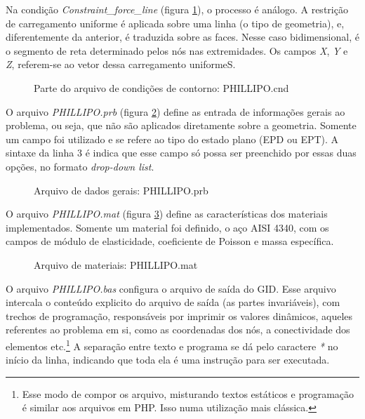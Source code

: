 Na condição \emph{Constraint\_force\_line} (figura \ref{fig:PHILLIPO.cnd_2}), o processo é análogo. A restrição de carregamento uniforme é aplicada sobre uma linha (o tipo de geometria), e, diferentemente da anterior, é traduzida sobre as faces. Nesse caso bidimensional, é o segmento de reta determinado pelos nós nas extremidades. Os campos \emph{X}, \emph{Y} e \emph{Z}, referem-se ao vetor dessa carregamento uniformeS.

\begin{figure}[hbtp]
    \caption{Parte do arquivo de condições de contorno: PHILLIPO.cnd}
    
    \label{fig:PHILLIPO.cnd_2}
\end{figure}

O arquivo \emph{PHILLIPO.prb} (figura \ref{fig:PHILLIPO.prb}) define as entrada de informações gerais ao problema, ou seja, que não são aplicados diretamente sobre a geometria. Somente um campo foi utilizado e se refere ao tipo do estado plano (EPD ou EPT). A sintaxe da linha 3 é indica que esse campo só possa ser preenchido por essas duas opções, no formato \emph{drop-down list}.
\begin{figure}[hbtp]
    \caption{Arquivo de dados gerais: PHILLIPO.prb}
    
    \label{fig:PHILLIPO.prb}
\end{figure}

O arquivo \emph{PHILLIPO.mat} (figura \ref{fig:PHILLIPO.mat}) define as características dos materiais implementados. Somente um material foi definido, o aço AISI 4340, com os campos de módulo de elasticidade, coeficiente de Poisson e massa específica.

\begin{figure}[hbtp]
    \caption{Arquivo de materiais: PHILLIPO.mat}
    
    \label{fig:PHILLIPO.mat}
\end{figure}

O arquivo \emph{PHILLIPO.bas} configura o arquivo de saída do GID. Esse arquivo intercala o conteúdo explicito do arquivo de saída (as partes invariáveis), com trechos de programação, responsáveis por imprimir os valores dinâmicos, aqueles referentes ao problema em si, como as coordenadas dos nós, a conectividade dos elementos etc.\footnote{Esse modo de compor os arquivo, misturando textos estáticos e programação é similar aos arquivos em PHP. Isso numa utilização mais clássica.} A separação entre texto e programa se dá pelo caractere \emph{*} no início da linha, indicando que toda ela é uma instrução para ser executada. 

